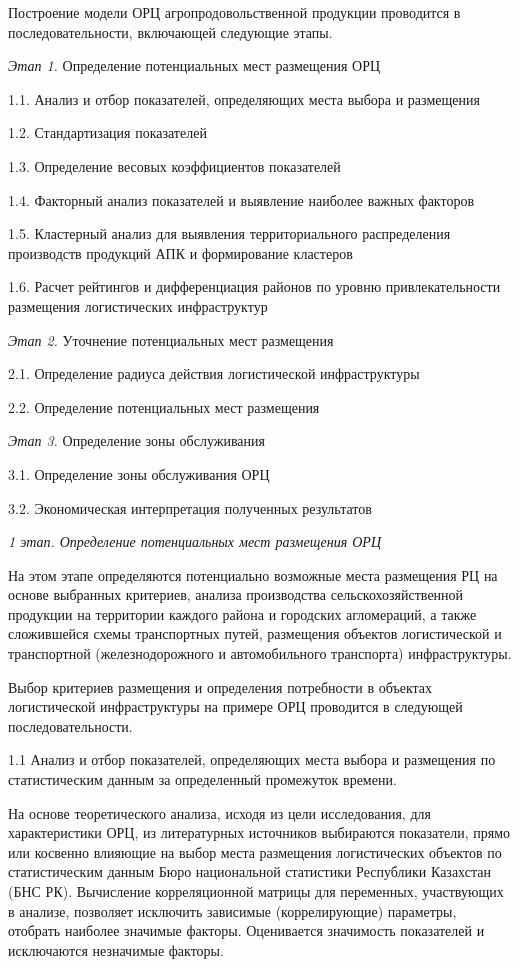 \begin{multicols}{2}
Построение модели ОРЦ агропродовольственной продукции проводится в
последовательности, включающей следующие этапы.

\emph{Этап 1.} Определение потенциальных мест размещения ОРЦ

1.1. Анализ и отбор показателей, определяющих места выбора и размещения

1.2. Стандартизация показателей

1.3. Определение весовых коэффициентов показателей

1.4. Факторный анализ показателей и выявление наиболее важных факторов

1.5. Кластерный анализ для выявления территориального распределения
производств продукций АПК и формирование кластеров

1.6. Расчет рейтингов и дифференциация районов по уровню
привлекательности размещения логистических инфраструктур

\emph{Этап 2.} Уточнение потенциальных мест размещения

2.1. Определение радиуса действия логистической инфраструктуры

2.2. Определение потенциальных мест размещения

\emph{Этап 3.} Определение зоны обслуживания

3.1. Определение зоны обслуживания ОРЦ

3.2. Экономическая интерпретация полученных результатов

\emph{1 этап. Определение потенциальных мест размещения ОРЦ}

На этом этапе определяются потенциально возможные места размещения РЦ на
основе выбранных критериев, анализа производства сельскохозяйственной
продукции на территории каждого района и городских агломераций, а также
сложившейся схемы транспортных путей, размещения объектов логистической
и транспортной (железнодорожного и автомобильного транспорта)
инфраструктуры.

Выбор критериев размещения и определения потребности в объектах
логистической инфраструктуры на примере ОРЦ проводится в следующей
последовательности.

1.1 Анализ и отбор показателей, определяющих места выбора и размещения по
статистическим данным за определенный промежуток времени.

На основе теоретического анализа, исходя из цели исследования, для
характеристики ОРЦ, из литературных источников выбираются показатели,
прямо или косвенно влияющие на выбор места размещения логистических
объектов по статистическим данным Бюро национальной статистики
Республики Казахстан (БНС РК). Вычисление корреляционной матрицы для
переменных, участвующих в анализе, позволяет исключить зависимые
(коррелирующие) параметры, отобрать наиболее значимые факторы.
Оценивается значимость показателей и исключаются незначимые факторы.


\end{multicols}
